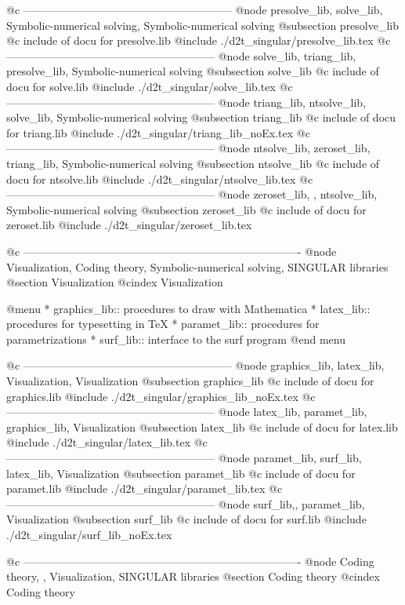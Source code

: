 @c ---------------------------------------------------------
@node presolve_lib, solve_lib, Symbolic-numerical solving, Symbolic-numerical solving
@subsection presolve_lib
@c include of docu for presolve.lib
@include ./d2t_singular/presolve_lib.tex
@c ---------------------------------------------------------
@node solve_lib, triang_lib, presolve_lib, Symbolic-numerical solving
@subsection solve_lib
@c include of docu for solve.lib
@include ./d2t_singular/solve_lib.tex
@c ---------------------------------------------------------
@node triang_lib, ntsolve_lib,  solve_lib, Symbolic-numerical solving
@subsection triang_lib
@c include of docu for triang.lib
@include ./d2t_singular/triang_lib_noEx.tex
@c ---------------------------------------------------------
@node ntsolve_lib, zeroset_lib, triang_lib, Symbolic-numerical solving
@subsection ntsolve_lib
@c include of docu for ntsolve.lib
@include ./d2t_singular/ntsolve_lib.tex
@c ---------------------------------------------------------
@node zeroset_lib, , ntsolve_lib, Symbolic-numerical solving
@subsection zeroset_lib
@c include of docu for zeroset.lib
@include ./d2t_singular/zeroset_lib.tex

@c ----------------------------------------------------------------------------
@node Visualization, Coding theory, Symbolic-numerical solving, SINGULAR libraries
@section Visualization
@cindex Visualization

@menu
* graphics_lib:: procedures to draw  with Mathematica
* latex_lib:: procedures for typesetting in TeX
* paramet_lib:: procedures for parametrizations
* surf_lib:: interface to the surf program
@end menu

@c ---------------------------------------------------------
@node graphics_lib, latex_lib, Visualization, Visualization
@subsection graphics_lib
@c include of docu for graphics.lib
@include ./d2t_singular/graphics_lib_noEx.tex
@c ---------------------------------------------------------
@node latex_lib, paramet_lib, graphics_lib, Visualization
@subsection latex_lib
@c include of docu for latex.lib
@include ./d2t_singular/latex_lib.tex
@c ---------------------------------------------------------
@node paramet_lib, surf_lib, latex_lib, Visualization
@subsection paramet_lib
@c include of docu for paramet.lib
@include ./d2t_singular/paramet_lib.tex
@c ---------------------------------------------------------
@node surf_lib,, paramet_lib, Visualization
@subsection surf_lib
@c include of docu for surf.lib
@include ./d2t_singular/surf_lib_noEx.tex

@c ----------------------------------------------------------------------------
@node Coding theory, , Visualization, SINGULAR libraries
@section Coding theory
@cindex Coding theory

